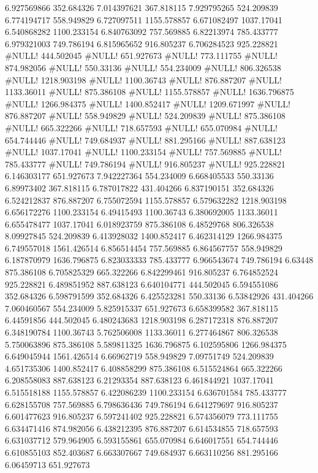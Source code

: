 6.927569866	352.684326
7.014397621	367.818115
7.929795265	524.209839
6.774194717	558.949829
6.727097511	1155.578857
6.671082497	1037.17041
6.540868282	1100.233154
6.840763092	757.569885
6.82213974	785.433777
6.979321003	749.786194
6.815965652	916.805237
6.706284523	925.228821
#NULL!	444.502045
#NULL!	651.927673
#NULL!	773.111755
#NULL!	874.982056
#NULL!	550.33136
#NULL!	554.234009
#NULL!	806.326538
#NULL!	1218.903198
#NULL!	1100.36743
#NULL!	876.887207
#NULL!	1133.36011
#NULL!	875.386108
#NULL!	1155.578857
#NULL!	1636.796875
#NULL!	1266.984375
#NULL!	1400.852417
#NULL!	1209.671997
#NULL!	876.887207
#NULL!	558.949829
#NULL!	524.209839
#NULL!	875.386108
#NULL!	665.322266
#NULL!	718.657593
#NULL!	655.070984
#NULL!	654.744446
#NULL!	749.684937
#NULL!	881.295166
#NULL!	887.638123
#NULL!	1037.17041
#NULL!	1100.233154
#NULL!	757.569885
#NULL!	785.433777
#NULL!	749.786194
#NULL!	916.805237
#NULL!	925.228821
6.146303177	651.927673
7.942227364	554.234009
6.668405533	550.33136
6.89973402	367.818115
6.787017822	431.404266
6.837190151	352.684326
6.524212837	876.887207
6.755072594	1155.578857
6.579632282	1218.903198
6.656172276	1100.233154
6.49415493	1100.36743
6.380692005	1133.36011
6.655478477	1037.17041
6.018923759	875.386108
6.48529768	806.326538
8.09927845	524.209839
6.413928032	1400.852417
6.462314129	1266.984375
6.749557018	1561.426514
6.856514454	757.569885
6.864567757	558.949829
6.187870979	1636.796875
6.823033333	785.433777
6.966543674	749.786194
6.63448	875.386108
6.705825329	665.322266
6.842299461	916.805237
6.764852524	925.228821
6.489851952	887.638123
6.640104771	444.502045
6.594551086	352.684326
6.598791599	352.684326
6.425523281	550.33136
6.53842926	431.404266
7.060460567	554.234009
5.825915337	651.927673
6.658399582	367.818115
6.44591856	444.502045
6.480243683	1218.903198
6.287172318	876.887207
6.348190784	1100.36743
5.762506008	1133.36011
6.277464867	806.326538
5.750063896	875.386108
5.589811325	1636.796875
6.102595806	1266.984375
6.649045944	1561.426514
6.66962719	558.949829
7.09751749	524.209839
4.651735306	1400.852417
6.408858299	875.386108
6.515524864	665.322266
6.208558083	887.638123
6.21293354	887.638123
6.461844921	1037.17041
6.515518188	1155.578857
6.422086239	1100.233154
6.636701584	785.433777
6.628155708	757.569885
6.798636436	749.786194
6.641279697	916.805237
6.601477623	916.805237
6.597241402	925.228821
6.574356079	773.111755
6.634471416	874.982056
6.438212395	876.887207
6.614534855	718.657593
6.631037712	579.964905
6.593155861	655.070984
6.646017551	654.744446
6.610855103	852.403687
6.663307667	749.684937
6.663110256	881.295166
6.06459713	651.927673
